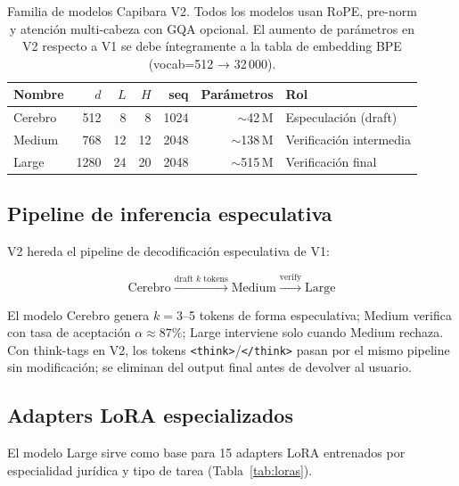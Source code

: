 \documentclass[11pt,a4paper]{article}
\begin{document}
\begin{table}[h]
\centering
\caption{Familia de modelos Capibara V2. Todos los modelos usan RoPE, pre-norm
y atención multi-cabeza con GQA opcional. El aumento de parámetros en V2 respecto a V1
se debe íntegramente a la tabla de embedding BPE (vocab=512 → 32\,000).}
\label{tab:models}
\begin{tabular}{lrrrrrl}
\toprule
\textbf{Nombre} & \textbf{$d$} & \textbf{$L$} & \textbf{$H$} & \textbf{seq} & \textbf{Parámetros} & \textbf{Rol} \\
\midrule
Cerebro   & 512  & 8  & 8  & 1024 & $\sim$42\,M  & Especulación (draft) \\
Medium    & 768  & 12 & 12 & 2048 & $\sim$138\,M & Verificación intermedia \\
Large     & 1280 & 24 & 20 & 2048 & $\sim$515\,M & Verificación final \\
\bottomrule
\end{tabular}
\end{table}

\subsection{Pipeline de inferencia especulativa}

V2 hereda el pipeline de decodificación especulativa de V1:

\begin{equation}
  \text{Cerebro} \xrightarrow{\text{draft } k \text{ tokens}} \text{Medium} \xrightarrow{\text{verify}} \text{Large}
\end{equation}

El modelo Cerebro genera $k=3$--5 tokens de forma especulativa; Medium verifica con
tasa de aceptación $\alpha \approx 87\%$; Large interviene solo cuando Medium rechaza.
Con think-tags en V2, los tokens \texttt{<think>}/\texttt{</think>} pasan por el mismo
pipeline sin modificación; se eliminan del output final antes de devolver al usuario.

\subsection{Adapters LoRA especializados}

El modelo Large sirve como base para 15 adapters LoRA entrenados por especialidad
jurídica y tipo de tarea (Tabla~\ref{tab:loras}).
\end{document}
